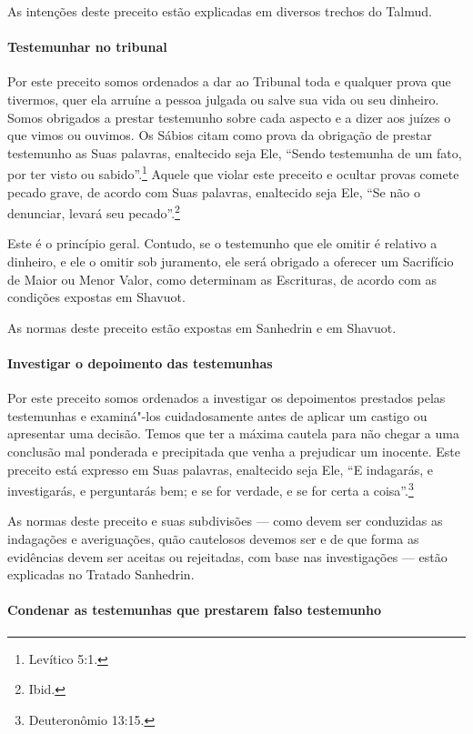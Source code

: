 \begin{multicols}{2}
As intenções deste preceito estão explicadas em diversos trechos do
Talmud\starr.

\paragraph{Testemunhar no tribunal}

Por este preceito somos ordenados a dar ao Tribunal toda e qualquer
prova que tivermos, quer ela arruíne a pessoa julgada ou salve sua vida
ou seu dinheiro. Somos obrigados a prestar testemunho sobre cada aspecto
e a dizer aos juízes o que vimos ou ouvimos. Os Sábios citam como prova
da obrigação de prestar testemunho as Suas palavras, enaltecido seja
Ele, ``Sendo testemunha de um fato, por ter visto ou sabido''.\footnote{Levítico
5:1.} Aquele que violar este preceito e ocultar provas comete pecado
grave, de acordo com Suas palavras, enaltecido seja Ele, ``Se não o
denunciar, levará seu pecado''.\footnote{Ibid.}

Este é o princípio geral. Contudo, se o testemunho que ele omitir é
relativo a dinheiro, e ele o omitir sob juramento, ele será obrigado a
oferecer um Sacrifício de Maior ou Menor Valor, como determinam as
Escrituras, de acordo com as condições expostas em Shavuot\starr.

As normas deste preceito estão expostas em Sanhedrin\starr{} e em Shavuot\starr.

\paragraph{Investigar o depoimento das testemunhas}

Por este preceito somos ordenados a investigar os depoimentos prestados
pelas testemunhas e examiná"-los cuidadosamente antes de aplicar um
castigo ou apresentar uma decisão. Temos que ter a máxima cautela para
não chegar a uma conclusão mal ponderada e precipitada que venha a
prejudicar um inocente. Este preceito está expresso em Suas palavras,
enaltecido seja Ele, ``E indagarás, e investigarás, e perguntarás bem; e
se for verdade, e se for certa a coisa''.\footnote{Deuteronômio 13:15.}

As normas deste preceito e suas subdivisões --- como devem ser
conduzidas as indagações e averiguações, quão cautelosos devemos ser e
de que forma as evidências devem ser aceitas ou rejeitadas, com base nas
investigações --- estão explicadas no Tratado Sanhedrin\starr.

\paragraph{Condenar as testemunhas que prestarem falso testemunho}


\end{multicols}
